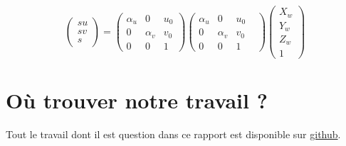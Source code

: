 \documentclass[12pt]{article}
\begin{document}
\begin{equation}
\begin{pmatrix}
su \\
sv \\
s
\end{pmatrix} = 
\begin{pmatrix}
\alpha_{u} & 0 & u_0 \\
0 & \alpha_{v} & v_0 \\
0 & 0 & 1
\end{pmatrix}
\begin{pmatrix}
\alpha_{u} & 0 & u_0 &  \\
0 & \alpha_{v} & v_0 \\
0 & 0 & 1
\end{pmatrix}
\begin{pmatrix}
X_w \\
Y_w \\
Z_w \\
1
\end{pmatrix}
\end{equation}

\section{Où trouver notre travail ?}

Tout le travail dont il est question dans ce rapport est disponible sur \href{https://github.com/antoinedenovembre/colorimetry_project_2}{github}.
\end{document}
